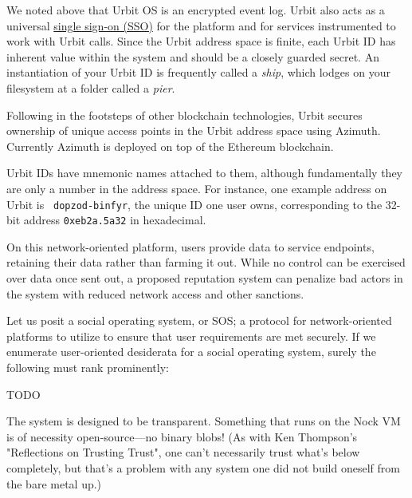 {{{We noted above that Urbit OS is an encrypted event log.  Urbit also acts as a universal \href{https://en.wikipedia.org/wiki/Single_sign-on}{single sign-on (SSO)} for the platform and for services instrumented to work with Urbit calls.  Since the Urbit address space is finite, each Urbit ID has inherent value within the system and should be a closely guarded secret.  An instantiation of your Urbit ID is frequently called a \emph{ship}, which lodges on your filesystem at a folder called a \emph{pier}.

Following in the footsteps of other blockchain technologies, Urbit secures ownership of unique access points in the Urbit address space using Azimuth.  Currently Azimuth is deployed on top of the Ethereum blockchain.

Urbit IDs have mnemonic names attached to them, although fundamentally they are only a number in the address space.  For instance, one example address on Urbit is \texttt{~dopzod-binfyr}, the unique ID one user owns, corresponding to the 32-bit address \texttt{0xeb2a.5a32} in hexadecimal.

On this network-oriented platform, users provide data to service endpoints, retaining their data rather than farming it out.  While no control can be exercised over data once sent out, a proposed reputation system can penalize bad actors in the system with reduced network access and other sanctions.

Let us posit a social operating system, or SOS;  a protocol for network-oriented platforms to utilize to ensure that user requirements are met securely.  If we enumerate user-oriented desiderata for a social operating system, surely the following must rank prominently:

TODO

The system is designed to be transparent.  Something that runs on the Nock VM is of necessity open-source—no binary blobs!  (As with Ken Thompson's "Reflections on Trusting Trust", one can't necessarily trust what's below completely, but that's a problem with any system one did not build oneself from the bare metal up.)

}}}

